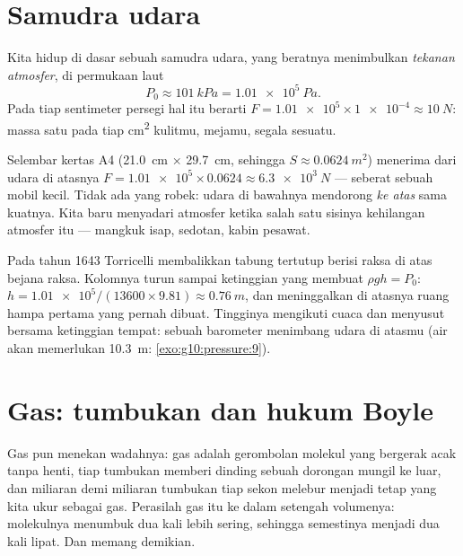 \section{Samudra udara}

\begin{definition}\label{def:g10:pressure:atmospheric}
Kita hidup di dasar sebuah samudra udara, yang beratnya menimbulkan
\emph{tekanan atmosfer}, di permukaan laut
\[
P_0 \approx \qty{101}{kPa} = \qty{1.01e5}{Pa}.
\]
Pada tiap sentimeter persegi hal itu berarti
$F = \num{1.01e5} \times \num{1e-4}
\approx \qty{10}{N}$:  massa
satu  pada tiap \unit{cm^2} kulitmu, mejamu, segala sesuatu.
\end{definition}

\begin{example}\label{ex:g10:pressure:sheet}
Selembar kertas A4 (\qty{21.0}{cm} $\times$ \qty{29.7}{cm}, sehingga
$S \approx \qty{0.0624}{m^2}$) menerima dari udara di atasnya
$F = \num{1.01e5} \times 0.0624 \approx \qty{6.3e3}{N}$ --- seberat
sebuah mobil kecil. Tidak ada yang robek: udara di bawahnya mendorong
\emph{ke atas} sama kuatnya. Kita baru menyadari atmosfer ketika salah
satu sisinya kehilangan atmosfer itu --- mangkuk isap, sedotan, kabin
pesawat.
\end{example}

\begin{remark}\label{rem:g10:pressure:torricelli}
Pada tahun 1643 Torricelli membalikkan tabung tertutup berisi raksa di
atas bejana raksa. Kolomnya turun sampai ketinggian yang membuat
$\rho g h = P_0$: $h = \num{1.01e5}/(13600 \times 9.81) \approx \qty{0.76}{m}$, dan meninggalkan di atasnya ruang hampa pertama yang
pernah dibuat. Tingginya mengikuti cuaca dan menyusut bersama
ketinggian tempat: sebuah barometer menimbang udara di atasmu (air akan
memerlukan \qty{10.3}{m}: \cref{exo:g10:pressure:9}).
\end{remark}

\section{Gas: tumbukan dan hukum Boyle}

Gas pun menekan wadahnya: gas adalah gerombolan molekul yang bergerak
acak tanpa henti, tiap tumbukan memberi dinding sebuah dorongan mungil
ke luar, dan miliaran demi miliaran tumbukan tiap sekon melebur menjadi
 tetap yang kita ukur sebagai  gas. Perasilah gas itu ke
dalam setengah volumenya: molekulnya menumbuk dua kali lebih sering,
sehingga  semestinya menjadi dua kali lipat. Dan memang
demikian.

